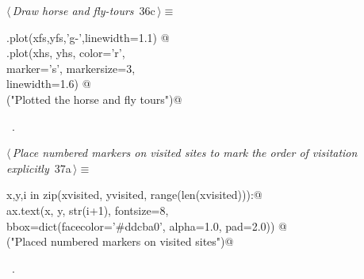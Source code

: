 \documentclass[11.5pt]{report}
\begin{document}
\begin{flushleft} \small
\begin{minipage}{\linewidth}\label{scrap46}\raggedright\small
{} $\langle\,${\itshape Draw horse and fly-tours}\nobreak\ {\footnotesize {36c}}$\,\rangle\equiv$
\vspace{-1ex}
\begin{list}{}{} \item
\mbox{}\verb@ax.plot(xfs,yfs,'g-',linewidth=1.1)  @\\
\mbox{}\verb@ax.plot(xhs, yhs, color='r', \@\\
\mbox{}\verb@        marker='s', markersize=3, \@\\
\mbox{}\verb@        linewidth=1.6) @\\
\mbox{}\verb@debug("Plotted the horse and fly tours")@\\
\mbox{}\verb@@{\NWsep}
\end{list}
\vspace{-1.5ex}
\footnotesize
\begin{list}{}{\setlength{\itemsep}{-\parsep}\setlength{\itemindent}{-\leftmargin}}
\item \NWtxtMacroRefIn\ .

\item{}
\end{list}
\end{minipage}\vspace{4ex}
\end{flushleft}

\begin{flushleft} \small\label{scrap47}\raggedright\small
{} $\langle\,${\itshape Place numbered markers on visited sites to mark the order of visitation explicitly}\nobreak\ {\footnotesize {37a}}$\,\rangle\equiv$
\vspace{-1ex}
\begin{list}{}{} \item
\mbox{}\verb@for x,y,i in zip(xvisited, yvisited, range(len(xvisited))):@\\
\mbox{}\verb@     ax.text(x, y, str(i+1),  fontsize=8, \@\\
\mbox{}\verb@             bbox=dict(facecolor='#ddcba0', alpha=1.0, pad=2.0)) @\\
\mbox{}\verb@debug("Placed numbered markers on visited sites")@\\
\mbox{}\verb@@{\NWsep}
\end{list}
\vspace{-1.5ex}
\footnotesize
\begin{list}{}{\setlength{\itemsep}{-\parsep}\setlength{\itemindent}{-\leftmargin}}
\item \NWtxtMacroRefIn\ .

\item{}
\end{list}
\vspace{4ex}
\end{flushleft}
\end{document}
